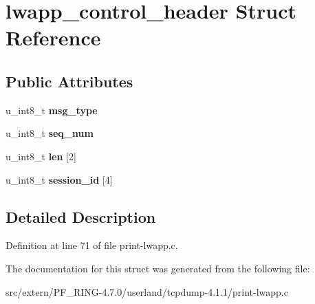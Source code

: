 \hypertarget{structlwapp__control__header}{
\section{lwapp\_\-control\_\-header Struct Reference}
\label{structlwapp__control__header}
}
\subsection*{Public Attributes}
\begin{DoxyCompactItemize}
\item 
\hypertarget{structlwapp__control__header_adbc58e62f129983b357cc54dd702fcdd}{
u\_\-int8\_\-t {\bfseries msg\_\-type}}
\label{structlwapp__control__header_adbc58e62f129983b357cc54dd702fcdd}

\item 
\hypertarget{structlwapp__control__header_a9483f8f593e6e8dee8ef69d2e5a7fb4d}{
u\_\-int8\_\-t {\bfseries seq\_\-num}}
\label{structlwapp__control__header_a9483f8f593e6e8dee8ef69d2e5a7fb4d}

\item 
\hypertarget{structlwapp__control__header_a09aa3f4e4a1e60eb2a2e9af93c75e931}{
u\_\-int8\_\-t {\bfseries len} \mbox{[}2\mbox{]}}
\label{structlwapp__control__header_a09aa3f4e4a1e60eb2a2e9af93c75e931}

\item 
\hypertarget{structlwapp__control__header_a8df0b41a7f32f8cde655989de66e5d4a}{
u\_\-int8\_\-t {\bfseries session\_\-id} \mbox{[}4\mbox{]}}
\label{structlwapp__control__header_a8df0b41a7f32f8cde655989de66e5d4a}

\end{DoxyCompactItemize}


\subsection{Detailed Description}


Definition at line 71 of file print-\/lwapp.c.



The documentation for this struct was generated from the following file:\begin{DoxyCompactItemize}
\item 
src/extern/PF\_\-RING-\/4.7.0/userland/tcpdump-\/4.1.1/print-\/lwapp.c\end{DoxyCompactItemize}

